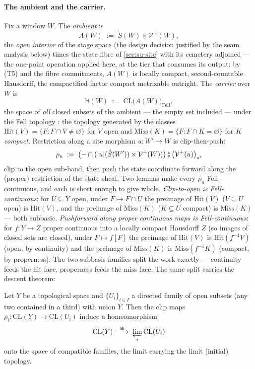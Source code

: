 \paragraph{The ambient and the carrier.} Fix a window $W$. The
\emph{ambient} is
\[
  A(W) \;:=\; \mathring{S}(W) \times \mathcal{V}^{+}(W),
\]
the \emph{open interior} of the stage space (the design decision
justified by the seam analysis below) times the state fibre of
\autoref{sec:su-site} with its cemetery adjoined --- the one-point
operation applied here, at the tier that consumes its output; by
(T5) and the fibre commitments, $A(W)$ is locally compact,
second-countable Hausdorff, the compactified factor compact
metrizable outright.
The \emph{carrier} over $W$ is
\[
  \mathbb{H}(W) \;:=\; \mathrm{CL}\bigl(A(W)\bigr)_{\mathrm{Fell}},
\]
the space of \emph{all} closed subsets of the ambient --- the empty
set included --- under the Fell topology \cite{fell62}: the topology
generated by the classes $\mathrm{Hit}(V) = \{F : F \cap V \neq
\varnothing\}$ for $V$ open and $\mathrm{Miss}(K) = \{F : F \cap K =
\varnothing\}$ for $K$ \emph{compact}. Restriction along a site
morphism $u \colon W' \to W$ is clip-then-push:
\[
  \rho_u \;:=\;
  \bigl({-} \cap (|u|(\mathring{S}(W')) \times \mathcal{V}^{+}(W))\bigr)
  \fatsemi \bigl(\mathcal{V}^{+}(u)\bigr)_{*},
\]
clip to the open sub-band, then push the state coordinate forward
along the (proper) restriction of the state sheaf. Two lemmas make
every $\rho_u$ Fell-continuous, and each is short enough to give
whole. \emph{Clip-to-open is Fell-continuous}: for $U \subseteq Y$
open, under $F \mapsto F \cap U$ the preimage of $\mathrm{Hit}(V)$
($V \subseteq U$ open) is $\mathrm{Hit}(V)$, and the preimage of
$\mathrm{Miss}(K)$ ($K \subseteq U$ compact) is $\mathrm{Miss}(K)$ ---
both subbasic. \emph{Pushforward along proper continuous maps is
Fell-continuous}: for $f \colon Y \to Z$ proper continuous into a
locally compact Hausdorff $Z$ (so images of closed sets are closed),
under $F \mapsto f[F]$ the preimage of $\mathrm{Hit}(V)$ is
$\mathrm{Hit}(f^{-1}V)$ (open, by continuity) and the preimage of
$\mathrm{Miss}(K)$ is $\mathrm{Miss}(f^{-1}K)$ (compact, by
properness). The two subbasis families split the work exactly ---
continuity feeds the hit face, properness feeds the miss face. The
same split carries the descent theorem:

\begin{theorem}
\label{thm:su-fell-descent}
Let $Y$ be a topological space and $\{U_i\}_{i \in I}$ a directed
family of open subsets (any two contained in a third) with union $Y$.
Then the clip maps $\rho_i \colon \mathrm{CL}(Y) \to \mathrm{CL}(U_i)$
induce a homeomorphism
\[
  \mathrm{CL}(Y) \;\xrightarrow{\;\cong\;}\;
  \varprojlim_i \mathrm{CL}(U_i)
\]
onto the space of compatible families, the limit carrying the limit
(initial) topology.
\end{theorem}

